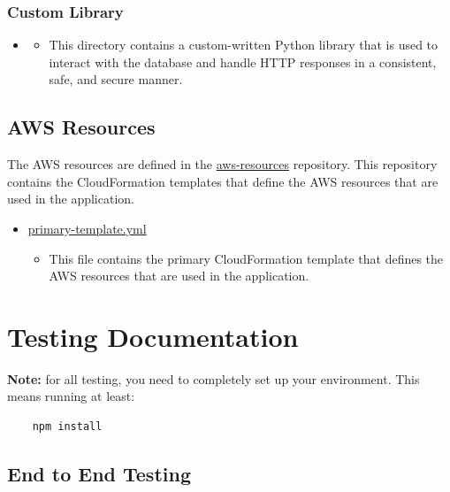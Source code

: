\documentclass[12pt]{article}
\begin{document}
\subsubsection{Custom Library}
\begin{itemize}
    \item \href{https://github.com/AboutMyHT/angular-app/tree/main/aboutmyhometown-lambda-stack/dependencies/python/amht_custom}{}
          \begin{itemize}
              \item This directory contains a custom-written Python library that is used to interact with the database and handle HTTP responses in a consistent, safe, and secure manner.
          \end{itemize}
\end{itemize}

\subsection{AWS Resources}

The AWS resources are defined in the \href{https://github.com/AboutMyHT/aws-resources}{aws-resources} repository. This repository contains the CloudFormation templates that define the AWS resources that are used in the application.
\begin{itemize}
    \item \href{https://github.com/AboutMyHT/aws-resources/blob/main/primary-template.yml}{primary-template.yml}
          \begin{itemize}
              \item This file contains the primary CloudFormation template that defines the AWS resources that are used in the application.
          \end{itemize}
\end{itemize}

\newpage

\section{Testing Documentation}

\textbf{Note:} for all testing, you need to completely set up your environment. This means running at least:
\begin{verbatim}
    npm install
\end{verbatim}

\subsection{End to End Testing}
\end{document}
